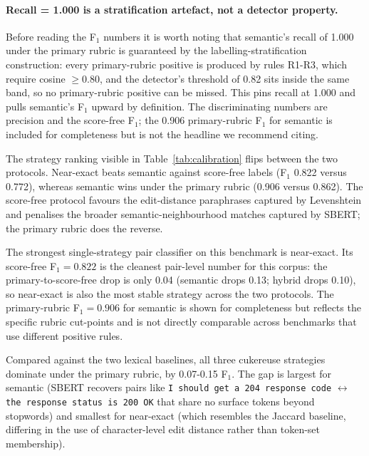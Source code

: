 \documentclass[11pt,a4paper]{article}
\begin{document}
\paragraph{Recall = 1.000 is a stratification artefact, not a
detector property.} Before reading the F$_1$ numbers it is worth
noting that semantic's recall of 1.000 under the primary rubric
is guaranteed by the labelling-stratification construction:
every primary-rubric positive is produced by rules R1-R3, which
require cosine $\geq 0.80$, and the detector's threshold of 0.82
sits inside the same band, so no primary-rubric positive can be
missed. This pins recall at 1.000 and pulls semantic's F$_1$ upward
by definition. The discriminating numbers are precision and the
score-free F$_1$; the 0.906 primary-rubric F$_1$ for semantic is
included for completeness but is not the headline we recommend
citing.

The strategy ranking visible in Table~\ref{tab:calibration} flips
between the two protocols. Near-exact beats
semantic against score-free labels (F$_1$ 0.822 versus 0.772),
whereas semantic wins under the primary rubric (0.906 versus 0.862).
The score-free protocol favours the edit-distance paraphrases
captured by Levenshtein and penalises the broader
semantic-neighbourhood matches captured by SBERT; the primary
rubric does the reverse.

The strongest single-strategy pair classifier on this benchmark is
near-exact. Its score-free F$_1 = 0.822$ is the cleanest pair-level
number for this corpus: the primary-to-score-free drop is only 0.04
(semantic drops 0.13; hybrid drops 0.10), so near-exact is also the
most stable strategy across the two protocols. The primary-rubric
F$_1 = 0.906$ for semantic is shown for completeness but reflects
the specific rubric cut-points and is not directly comparable across
benchmarks that use different positive rules.

Compared against the two lexical baselines, all three cukereuse
strategies dominate under the primary rubric, by 0.07-0.15 F$_1$.
The gap is largest for semantic (SBERT recovers pairs like
\texttt{I should get a 204 response code} $\leftrightarrow$
\texttt{the response status is 200 OK} that share no surface tokens
beyond stopwords) and smallest for near-exact (which resembles the
Jaccard baseline, differing in the use of character-level edit
distance rather than token-set membership).
\end{document}
